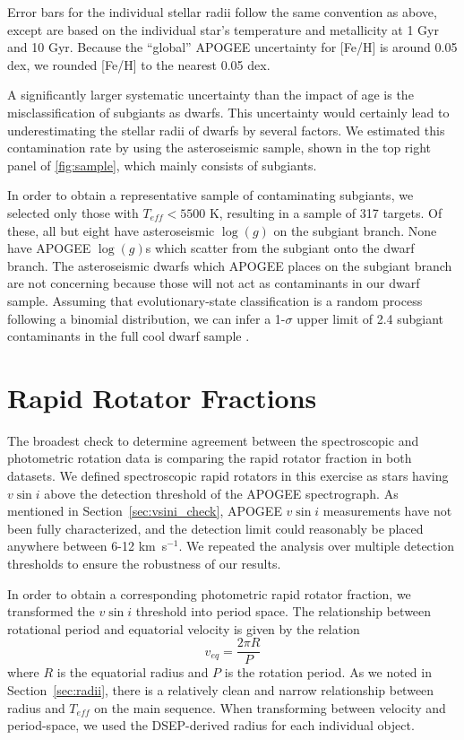 \documentclass[manuscript]{aastex6}
\newcommand{\vsini}{\ensuremath{v \sin i}}
\newcommand{\Teff}{\ensuremath{T_{eff}}}
\newcommand{\logg}{\ensuremath{\log(g)}}
\newcommand{\kms}{\textrm{ km~s}\ensuremath{^{-1}}}
\begin{document}
Error bars for the individual stellar radii follow the same convention as
above, except are based on the individual star's temperature and metallicity 
at 1 Gyr and 10 Gyr. Because the ``global'' APOGEE uncertainty for [Fe/H] is 
around 0.05 dex, we rounded [Fe/H] to the nearest 0.05 dex.

A significantly larger systematic uncertainty than the impact of age is the 
misclassification of
subgiants as dwarfs. This uncertainty would certainly lead to underestimating
the stellar radii of dwarfs by several factors. We estimated this
contamination rate by using the asteroseismic sample, shown in the top right
panel of \cref{fig:sample}, which mainly consists of subgiants. 

In order to obtain a representative sample of contaminating subgiants, we
selected only those with \(\Teff < 5500\) K, resulting in a sample of 317
targets. Of these, all but eight have asteroseismic \logg{} on the subgiant
branch. None have APOGEE \logg{}s which scatter from the subgiant onto the 
dwarf branch. The asteroseismic dwarfs which APOGEE places on the
subgiant branch are not concerning because those will not act as contaminants 
in our dwarf sample. Assuming that evolutionary-state classification is a 
random process following a binomial distribution, we can infer a 1-\(\sigma\) 
upper limit of 2.4 subgiant contaminants in the full cool dwarf sample
\citep{Gehrels86}. 

\section{Rapid Rotator Fractions}
\label{sec:fraction}

The broadest check to determine agreement between the spectroscopic
and photometric rotation data is comparing the rapid rotator fraction
in both datasets. We defined spectroscopic rapid rotators in this exercise as 
stars having \vsini{} above the detection threshold of the APOGEE 
spectrograph. As mentioned in 
Section~\ref{sec:vsini_check}, APOGEE \vsini{} measurements have not been fully
characterized, and the detection limit could reasonably be placed anywhere 
between 6-12 \kms{}. We repeated the analysis over multiple detection 
thresholds to ensure the robustness of our results.

In order to obtain a corresponding photometric rapid rotator fraction, we 
transformed the \vsini{} threshold into period space. The relationship between 
rotational period and equatorial velocity is given by the relation
\begin{displaymath}
    v_{eq} = \frac{2 \pi R}{P} 
\end{displaymath}
where \(R\) is the equatorial radius and \(P\) is the rotation period. As we
noted in Section~\ref{sec:radii}, there is a relatively clean and narrow
relationship between radius and \Teff{} on the main sequence. When transforming
between velocity and period-space, we used the DSEP-derived radius for each
individual object.
\end{document}

